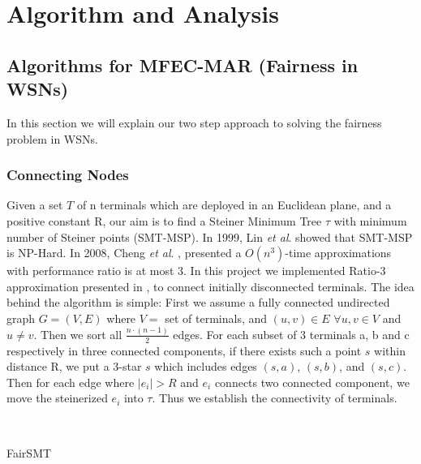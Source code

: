 \section{Algorithm and Analysis}\label{analysis}

\subsection{Algorithms for MFEC-MAR (Fairness in WSNs)}
In this section we will explain our two step approach to solving the fairness problem in WSNs.

\subsubsection{Connecting Nodes}
Given a set $T$ of n terminals which are deployed in an Euclidean plane, and a positive constant R, our aim is to find a Steiner Minimum Tree $\tau$ with minimum number of Steiner points (SMT-MSP). In 1999, Lin \textit{et al}. \cite{308672} showed that SMT-MSP is NP-Hard. In 2008, Cheng \textit{et al}. \cite{RelaySensor}, presented a $O(n^{3})$-time approximations with performance ratio is at most 3. In this project we implemented Ratio-3 approximation presented in \cite{RelaySensor}, to connect initially disconnected terminals. The idea behind the algorithm is simple: First we assume a fully connected undirected graph $G=(V,E)$ where $V=$ set of terminals, and $(u,v)\in E$ $\forall u,v \in V$ and $u\neq v$. Then we sort all $\frac{n\cdot(n-1)}{2}$ edges. For each subset of 3 terminals a, b and c respectively in three connected components, if there exists such a point $s$ within distance R, we put a 3-star $s$ which includes edges $(s,a)$, $(s,b)$, and $(s,c)$. Then for each edge where $\left|e_i\right| > R$ and $e_i$ connects two connected component, we move the steinerized $e_i$ into $\tau$. Thus we establish the connectivity of terminals.

\linesnumbered
\begin{algorithm}[htp]

\dontprintsemicolon
{}
\\
\caption{FairSMT}
\label{FairSMT}
\end{algorithm}


